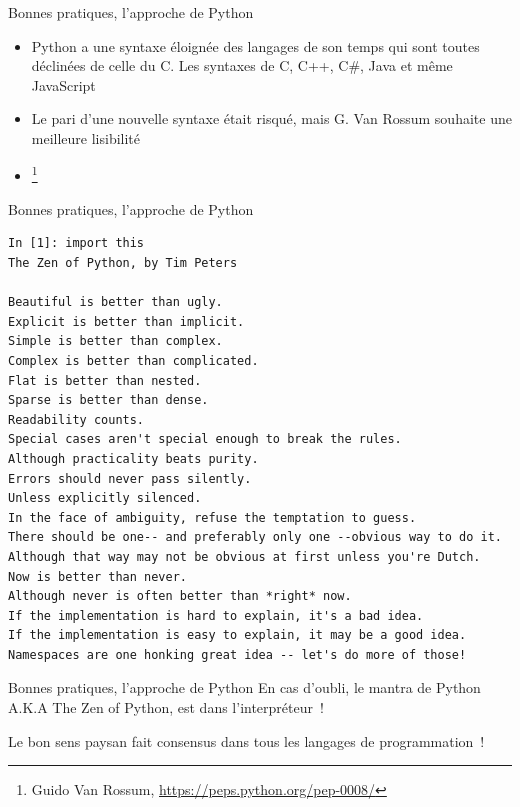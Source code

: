 \documentclass{beamer}
\begin{document}
    \begin{frame}{Bonnes pratiques, l'approche de Python}
        \begin{itemize}
            \item Python a une syntaxe éloignée des langages de son temps qui sont toutes déclinées de celle du C. Les syntaxes de C, C++, C\#, Java et même JavaScript
            \item Le pari d'une nouvelle syntaxe était risqué, mais G. Van Rossum souhaite une meilleure lisibilité
            \item {}\footnote{Guido Van Rossum, \url{https://peps.python.org/pep-0008/}}
        \end{itemize}
    \end{frame}

    \begin{frame}[fragile]{Bonnes pratiques, l'approche de Python}
        \begin{lstlisting}
In [1]: import this
The Zen of Python, by Tim Peters

Beautiful is better than ugly.
Explicit is better than implicit.
Simple is better than complex.
Complex is better than complicated.
Flat is better than nested.
Sparse is better than dense.
Readability counts.
Special cases aren't special enough to break the rules.
Although practicality beats purity.
Errors should never pass silently.
Unless explicitly silenced.
In the face of ambiguity, refuse the temptation to guess.
There should be one-- and preferably only one --obvious way to do it.
Although that way may not be obvious at first unless you're Dutch.
Now is better than never.
Although never is often better than *right* now.
If the implementation is hard to explain, it's a bad idea.
If the implementation is easy to explain, it may be a good idea.
Namespaces are one honking great idea -- let's do more of those!
        \end{lstlisting}
    \end{frame}

    \begin{frame}[fragile]{Bonnes pratiques, l'approche de Python}
        En cas d'oubli, le mantra de Python A.K.A The Zen of Python, est dans l'interpréteur~!

        \bigbreak

        Le bon sens paysan fait consensus dans tous les langages de programmation~!

    \end{frame}
\end{document}
